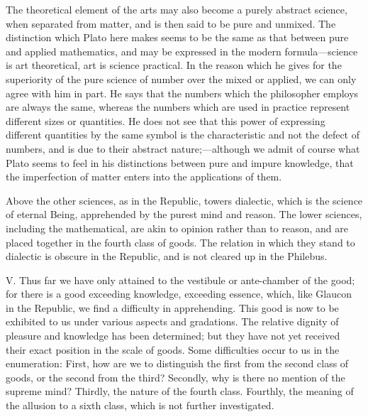 \documentclass[11pt,letter]{article}
\begin{document}
\par  The theoretical element of the arts may also become a purely abstract science, when separated from matter, and is then said to be pure and unmixed. The distinction which Plato here makes seems to be the same as that between pure and applied mathematics, and may be expressed in the modern formula—science is art theoretical, art is science practical. In the reason which he gives for the superiority of the pure science of number over the mixed or applied, we can only agree with him in part. He says that the numbers which the philosopher employs are always the same, whereas the numbers which are used in practice represent different sizes or quantities. He does not see that this power of expressing different quantities by the same symbol is the characteristic and not the defect of numbers, and is due to their abstract nature;—although we admit of course what Plato seems to feel in his distinctions between pure and impure knowledge, that the imperfection of matter enters into the applications of them.

\par  Above the other sciences, as in the Republic, towers dialectic, which is the science of eternal Being, apprehended by the purest mind and reason. The lower sciences, including the mathematical, are akin to opinion rather than to reason, and are placed together in the fourth class of goods. The relation in which they stand to dialectic is obscure in the Republic, and is not cleared up in the Philebus.

\par  V. Thus far we have only attained to the vestibule or ante-chamber of the good; for there is a good exceeding knowledge, exceeding essence, which, like Glaucon in the Republic, we find a difficulty in apprehending. This good is now to be exhibited to us under various aspects and gradations. The relative dignity of pleasure and knowledge has been determined; but they have not yet received their exact position in the scale of goods. Some difficulties occur to us in the enumeration: First, how are we to distinguish the first from the second class of goods, or the second from the third? Secondly, why is there no mention of the supreme mind? Thirdly, the nature of the fourth class. Fourthly, the meaning of the allusion to a sixth class, which is not further investigated.
\end{document}
